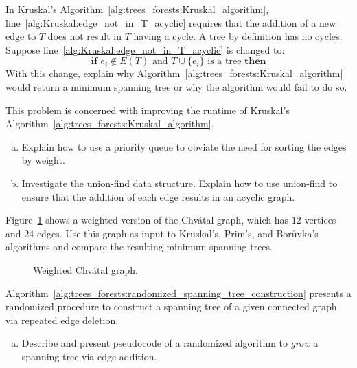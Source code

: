 \begin{problem}
\item In Kruskal's
  Algorithm~\ref{alg:trees_forests:Kruskal_algorithm},
  line~\ref{alg:Kruskal:edge_not_in_T_acyclic} requires that the
  addition of a new edge to $T$ does not result in $T$ having a
  cycle. A tree by definition has no cycles. Suppose
  line~\ref{alg:Kruskal:edge_not_in_T_acyclic} is changed to:
  \[
  \textbf{if } e_i \notin E(T)
  \text{ and }
  T \cup \{e_i\} \text{ is a tree } \textbf{then}
  \]
  With this change, explain why
  Algorithm~\ref{alg:trees_forests:Kruskal_algorithm} would return a
  minimum spanning tree or why the algorithm would fail to do so.

\item This problem is concerned with improving the runtime of
  Kruskal's
  Algorithm~\ref{alg:trees_forests:Kruskal_algorithm}.
  \begin{enumerate}[(a)]
  \item Explain how to use a priority queue to obviate the need for
    sorting the edges by weight.

  \item Investigate the union-find data
    structure. Explain how to use union-find to ensure that the
    addition of each edge results in an acyclic graph.
  \end{enumerate}

\item Figure~\ref{fig:trees_forests:weighted_Chvatal_graph} shows a
  weighted version of the Chv\'atal graph,
  which has $12$ vertices and $24$ edges. Use this graph as input to
  Kruskal's,
  Prim's, and
  Bor\r{u}vka's algorithms and compare
  the resulting minimum spanning trees.

\begin{figure}[!htbp]
\centering
{}

\caption{Weighted Chv\'atal graph.}
\label{fig:trees_forests:weighted_Chvatal_graph}
\end{figure}

\item Algorithm~\ref{alg:trees_forests:randomized_spanning_tree_construction}
  presents a randomized procedure to construct a
  spanning tree of a
  given connected graph via repeated edge deletion.
  \begin{enumerate}[(a)]
  \item Describe and present pseudocode of a
    randomized algorithm to \emph{grow} a
    spanning tree via edge addition.


\end{enumerate}
\end{problem}
